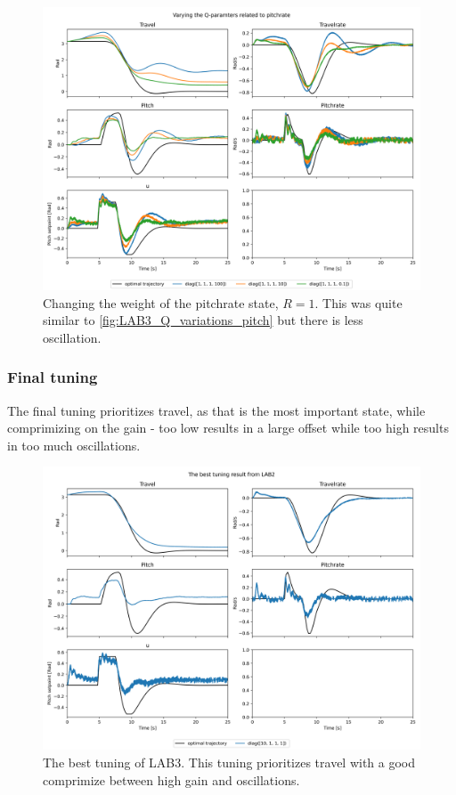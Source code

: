 \documentclass[../main.tex]{subfiles}
\begin{document}
\begin{figure}[h]
	\centering
	\includegraphics[width=0.8\linewidth]{figures/LAB3_Q_variations_pitchrate.png}
	\caption{Changing the weight of the pitchrate state, $R=1$. This was quite similar to \cref{fig:LAB3_Q_variations_pitch} but there is less oscillation.}
	\label{fig:LAB3_Q_variations_pitchrate}
\end{figure}

\subsubsection{Final tuning}
The final tuning prioritizes travel, as that is the most important state, while comprimizing on the gain - too low results in a large offset while too high results in too much oscillations.

\begin{figure}[h]
	\centering
	\includegraphics[width=0.8\linewidth]{figures/LAB3_best_tuning.png}
	\caption{The best tuning of LAB3. This tuning prioritizes travel with a good comprimize between high gain and oscillations.}
\end{figure}
\end{document}
